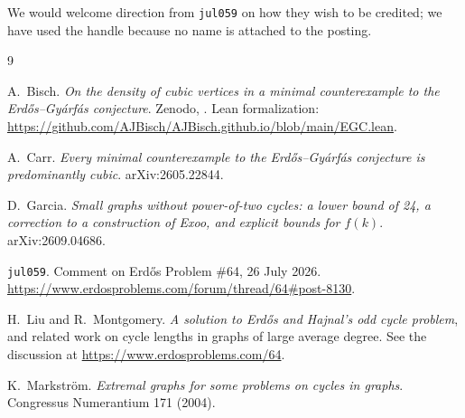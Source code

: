 \documentclass[11pt,a4paper]{article}
\begin{document}
We would welcome direction from \texttt{jul059} on how they wish to be credited; we have
used the handle because no name is attached to the posting.

\begin{thebibliography}{9}

A.~Bisch.
\newblock \emph{On the density of cubic vertices in a minimal counterexample to the
Erd\H{o}s--Gy\'arf\'as conjecture}.
\newblock Zenodo, . Lean formalization:
\url{https://github.com/AJBisch/AJBisch.github.io/blob/main/EGC.lean}.

A.~Carr.
\newblock \emph{Every minimal counterexample to the Erd\H{o}s--Gy\'arf\'as conjecture is
predominantly cubic}.
\newblock arXiv:2605.22844.

D.~Garcia.
\newblock \emph{Small graphs without power-of-two cycles: a lower bound of 24, a correction
to a construction of Exoo, and explicit bounds for $f(k)$}.
\newblock arXiv:2609.04686.

\texttt{jul059}.
\newblock Comment on Erd\H{o}s Problem \#64, 26 July 2026.
\newblock \url{https://www.erdosproblems.com/forum/thread/64\#post-8130}.

H.~Liu and R.~Montgomery.
\newblock \emph{A solution to Erd\H{o}s and Hajnal's odd cycle problem}, and related work on
cycle lengths in graphs of large average degree.
\newblock See the discussion at \url{https://www.erdosproblems.com/64}.

K.~Markstr\"om.
\newblock \emph{Extremal graphs for some problems on cycles in graphs}.
\newblock Congressus Numerantium 171 (2004).

\end{thebibliography}
\end{document}
